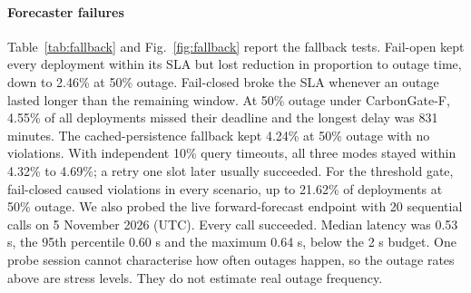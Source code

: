 \documentclass[journal]{IEEEtran}
\begin{document}
\paragraph{Forecaster failures} Table~\ref{tab:fallback} and Fig.~\ref{fig:fallback} report the fallback tests. Fail-open kept every deployment within its SLA but lost reduction in proportion to outage time, down to 2.46\% at 50\% outage. Fail-closed broke the SLA whenever an outage lasted longer than the remaining window. At 50\% outage under CarbonGate-F, 4.55\% of all deployments missed their deadline and the longest delay was 831 minutes. The cached-persistence fallback kept 4.24\% at 50\% outage with no violations. With independent 10\% query timeouts, all three modes stayed within 4.32\% to 4.69\%; a retry one slot later usually succeeded. For the threshold gate, fail-closed caused violations in every scenario, up to 21.62\% of deployments at 50\% outage. We also probed the live forward-forecast endpoint with 20 sequential calls on 5 November 2026 (UTC). Every call succeeded. Median latency was 0.53 s, the 95th percentile 0.60 s and the maximum 0.64 s, below the 2 s budget. One probe session cannot characterise how often outages happen, so the outage rates above are stress levels. They do not estimate real outage frequency.
\end{document}
